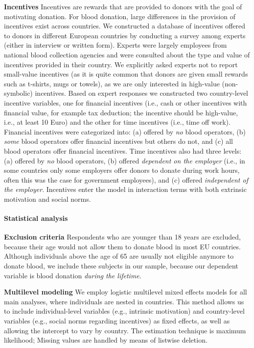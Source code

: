 \documentclass[AER]{AEA}
\begin{document}
\textbf{Incentives} Incentives are rewards that are provided to donors with the goal of motivating donation.  For blood donation, large differences in the provision of incentives exist across countries. We constructed a database of incentives offered to donors in different European countries by conducting a survey among experts (either in interview or written form). Experts were largely employees from national blood collection agencies and were consulted about the type and value of incentives provided in their country. We explicitly asked experts not to report small-value incentives (as it is quite common that donors are given small rewards such as t-shirts, mugs or towels), as we are only interested in high-value (non-symbolic) incentives. Based on expert responses we constructed two country-level incentive variables, one for financial incentives (i.e., cash or other incentives with financial value, for example tax deduction; the incentive should be high-value, i.e., at least 10 Euro) and the other for time incentives (i.e., time off work). Financial incentives were categorized into: (a) offered by \textit{no} blood operators, (b) \textit{some} blood operators offer financial incentives but others do not, and (c) all blood operators offer financial incentives. Time incentives also had three levels: (a) offered by \textit{no} blood operators, (b) offered \textit{dependent on the employer} (i.e., in some countries only some employers offer donors to donate during work hours, often this was the case for government employees), and (c) offered \textit{independent of the employer}. Incentives enter the model in interaction terms with both extrinsic motivation and social norms. %


\paragraph{Statistical analysis}

\textbf{Exclusion criteria} Respondents who are younger than 18 years are excluded, because their age would not allow them to donate blood in most EU countries. Although individuals above the age of 65 are usually not eligible anymore to donate blood, we include these subjects in our sample, because our dependent variable is blood donation \textit{during the lifetime}. 

\textbf{Multilevel modeling} We employ logistic multilevel mixed effects models for all main analyses, where individuals are nested in countries. This method allows us to include individual-level variables (e.g., intrinsic motivation) and country-level variables (e.g., social norms regarding incentives) as fixed effects, as well as allowing the intercept to vary by country. The estimation technique is maximum likelihood; Missing values are handled by means of listwise deletion. 
\end{document}
